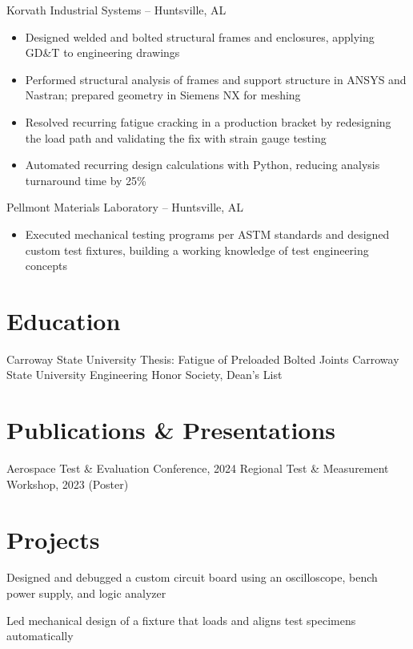 \documentclass{resume}
\begin{document}
     {Korvath Industrial Systems -- Huntsville, AL}
\begin{itemize}
  \item Designed welded and bolted structural frames and enclosures, applying GD\&T to engineering drawings
  \item Performed structural analysis of frames and support structure in ANSYS and Nastran; prepared geometry in Siemens NX for meshing
  \item Resolved recurring fatigue cracking in a production bracket by redesigning the load path and validating the fix with strain gauge testing
  \item Automated recurring design calculations with Python, reducing analysis turnaround time by 25\%
\end{itemize}

     {Pellmont Materials Laboratory -- Huntsville, AL}
\begin{itemize}
  \item Executed mechanical testing programs per ASTM standards and designed custom test fixtures, building a working knowledge of test engineering concepts
\end{itemize}

\pagebreak

\section*{Education}
       {Carroway State University}
       {Thesis: Fatigue of Preloaded Bolted Joints}
       {Carroway State University}
       {Engineering Honor Society, Dean's List}

\section*{Publications \& Presentations}
            {Aerospace Test \& Evaluation Conference, 2024}
            {Regional Test \& Measurement Workshop, 2023 (Poster)}

\section*{Projects}
Designed and debugged a custom circuit board using an oscilloscope, bench power supply, and logic analyzer

Led mechanical design of a fixture that loads and aligns test specimens automatically
\end{document}
